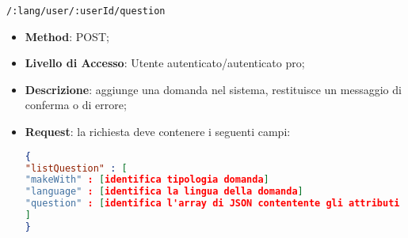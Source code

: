 	
	\item \texttt{/:lang/user/:userId/question}
		\begin{itemize}
			\item \textbf{Method}: POST;
			\item \textbf{Livello di Accesso}: Utente autenticato/autenticato pro;
			\item \textbf{Descrizione}: aggiunge una domanda nel sistema, restituisce un messaggio di conferma o di errore;
			\item \textbf{Request}: la richiesta deve contenere i seguenti campi:
\begin{lstlisting}[language=json,firstnumber=1]
{
"listQuestion" : [ 
"makeWith" : [identifica tipologia domanda]
"language" : [identifica la lingua della domanda]
"question" : [identifica l'array di JSON contentente gli attributi che formano una domanda]
]
}
\end{lstlisting}
		\end{itemize}